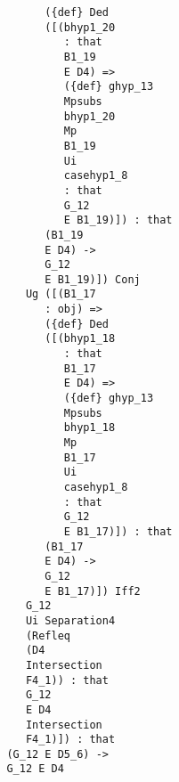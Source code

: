 \documentclass[12pt]{article}
\begin{document}
\begin{verbatim}
                                        ({def} Ded 
                                        ([(bhyp1_20 
                                           : that 
                                           B1_19 
                                           E D4) => 
                                           ({def} ghyp_13 
                                           Mpsubs 
                                           bhyp1_20 
                                           Mp 
                                           B1_19 
                                           Ui 
                                           casehyp1_8 
                                           : that 
                                           G_12 
                                           E B1_19)]) : that 
                                        (B1_19 
                                        E D4) -> 
                                        G_12 
                                        E B1_19)]) Conj 
                                     Ug ([(B1_17 
                                        : obj) => 
                                        ({def} Ded 
                                        ([(bhyp1_18 
                                           : that 
                                           B1_17 
                                           E D4) => 
                                           ({def} ghyp_13 
                                           Mpsubs 
                                           bhyp1_18 
                                           Mp 
                                           B1_17 
                                           Ui 
                                           casehyp1_8 
                                           : that 
                                           G_12 
                                           E B1_17)]) : that 
                                        (B1_17 
                                        E D4) -> 
                                        G_12 
                                        E B1_17)]) Iff2 
                                     G_12 
                                     Ui Separation4 
                                     (Refleq 
                                     (D4 
                                     Intersection 
                                     F4_1)) : that 
                                     G_12 
                                     E D4 
                                     Intersection 
                                     F4_1)]) : that 
                                  (G_12 E D5_6) -> 
                                  G_12 E D4 

\end{verbatim}
\end{document}
